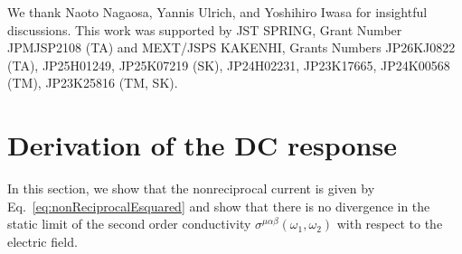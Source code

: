 \documentclass[twocolumn,superscriptaddress]{revtex4-1}
\begin{document}
\begin{acknowledgements}
We thank Naoto Nagaosa, Yannis Ulrich, and Yoshihiro Iwasa for insightful discussions. This work was supported by JST SPRING, Grant Number JPMJSP2108 (TA) and MEXT/JSPS KAKENHI, Grants Numbers JP26KJ0822 (TA), JP25H01249, JP25K07219 (SK), JP24H02231, JP23K17665, JP24K00568 (TM), JP23K25816 (TM, SK).
\end{acknowledgements}



\appendix

\section{Derivation of the DC response} \label{app:deriveDC}
In this section, we show that the nonreciprocal current is given by Eq.~\eqref{eq:nonReciprocalEsquared} and show that there is no divergence in the static limit of the second order conductivity $\sigma^{\mu\alpha\beta}(\omega_1,\omega_2)$ with respect to the electric field.
\end{document}
